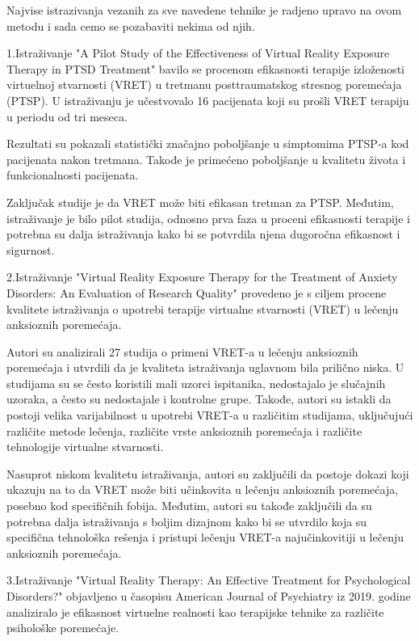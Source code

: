 \documentclass[a4paper]{article}
\begin{document}
Najvise istrazivanja vezanih za sve navedene tehnike je radjeno upravo na ovom metodu i sada cemo se pozabaviti nekima od njih.

1.Istraživanje "A Pilot Study of the Effectiveness of Virtual Reality Exposure Therapy in PTSD Treatment" bavilo se procenom efikasnosti terapije izloženosti virtuelnoj stvarnosti (VRET) u tretmanu posttraumatskog stresnog poremećaja (PTSP). U istraživanju je učestvovalo 16 pacijenata koji su prošli VRET terapiju u periodu od tri meseca.

Rezultati su pokazali statistički značajno poboljšanje u simptomima PTSP-a kod pacijenata nakon tretmana. Takođe je primećeno poboljšanje u kvalitetu života i funkcionalnosti pacijenata.

Zaključak studije je da VRET može biti efikasan tretman za PTSP. Međutim, istraživanje je bilo pilot studija, odnosno prva faza u proceni efikasnosti terapije i potrebna su dalja istraživanja kako bi se potvrdila njena dugoročna efikasnost i sigurnost.

2.Istraživanje "Virtual Reality Exposure Therapy for the Treatment of Anxiety Disorders: An Evaluation of Research Quality" provedeno je s ciljem procene kvalitete istraživanja o upotrebi terapije virtualne stvarnosti (VRET) u lečenju anksioznih poremećaja.

Autori su analizirali 27 studija o primeni VRET-a u lečenju anksioznih poremećaja i utvrdili da je kvaliteta istraživanja uglavnom bila prilično niska. U studijama su se često koristili mali uzorci ispitanika, nedostajalo je slučajnih uzoraka, a često su nedostajale i kontrolne grupe. Takođe, autori su istakli da postoji velika varijabilnost u upotrebi VRET-a u različitim studijama, uključujući različite metode lečenja, različite vrste anksioznih poremećaja i različite tehnologije virtualne stvarnosti.

Nasuprot niskom kvalitetu istraživanja, autori su zaključili da postoje dokazi koji ukazuju na to da VRET može biti učinkovita u lečenju anksioznih poremećaja, posebno kod specifičnih fobija. Međutim, autori su takođe zaključili da su potrebna dalja istraživanja s boljim dizajnom kako bi se utvrdilo koja su specifična tehnološka rešenja i pristupi lečenju VRET-a najučinkovitiji u lečenju anksioznih poremećaja.

3.Istraživanje "Virtual Reality Therapy: An Effective Treatment for Psychological Disorders?" objavljeno u časopisu American Journal of Psychiatry iz 2019. godine analiziralo je efikasnost virtuelne realnosti kao terapijske tehnike za različite psihološke poremećaje.
\end{document}
